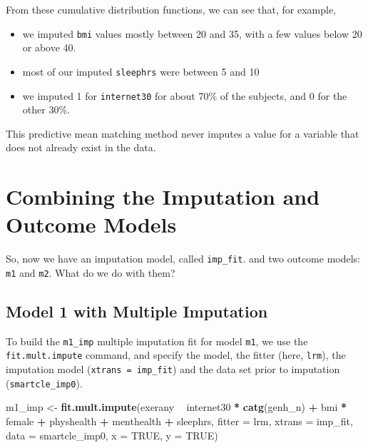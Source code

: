 \documentclass[]{book}
\newenvironment{Shaded}{\begin{snugshade}}{\end{snugshade}}
\newcommand{\KeywordTok}[1]{\textcolor[rgb]{0.13,0.29,0.53}{\textbf{#1}}}
\newcommand{\DataTypeTok}[1]{\textcolor[rgb]{0.13,0.29,0.53}{#1}}
\newcommand{\StringTok}[1]{\textcolor[rgb]{0.31,0.60,0.02}{#1}}
\newcommand{\OtherTok}[1]{\textcolor[rgb]{0.56,0.35,0.01}{#1}}
\newcommand{\OperatorTok}[1]{\textcolor[rgb]{0.81,0.36,0.00}{\textbf{#1}}}
\newcommand{\NormalTok}[1]{#1}
\providecommand{\tightlist}{%
  \setlength{\itemsep}{0pt}\setlength{\parskip}{0pt}}
\theoremstyle{definition}
\theoremstyle{definition}
\theoremstyle{definition}
\theoremstyle{remark}
\begin{document}
From these cumulative distribution functions, we can see that, for
example,

\begin{itemize}
\tightlist
\item
  we imputed \texttt{bmi} values mostly between 20 and 35, with a few
  values below 20 or above 40.
\item
  most of our imputed \texttt{sleephrs} were between 5 and 10
\item
  we imputed 1 for \texttt{internet30} for about 70\% of the subjects,
  and 0 for the other 30\%.
\end{itemize}

This predictive mean matching method never imputes a value for a
variable that does not already exist in the data.

\section{Combining the Imputation and Outcome
Models}\label{combining-the-imputation-and-outcome-models}

So, now we have an imputation model, called \texttt{imp\_fit}. and two
outcome models: \texttt{m1} and \texttt{m2}. What do we do with them?

\subsection{Model 1 with Multiple
Imputation}\label{model-1-with-multiple-imputation}

To build the \texttt{m1\_imp} multiple imputation fit for model
\texttt{m1}, we use the \texttt{fit.mult.impute} command, and specify
the model, the fitter (here, \texttt{lrm}), the imputation model
(\texttt{xtrans\ =\ imp\_fit}) and the data set prior to imputation
(\texttt{smartcle\_imp0}).

\begin{Shaded}
\begin{Highlighting}[]
\NormalTok{m1_imp <-}\StringTok{ }\KeywordTok{fit.mult.impute}\NormalTok{(exerany }\OperatorTok{~}\StringTok{ }
\StringTok{            }\NormalTok{internet30 }\OperatorTok{*}\StringTok{ }\KeywordTok{catg}\NormalTok{(genh_n) }\OperatorTok{+}\StringTok{ }\NormalTok{bmi }\OperatorTok{*}\StringTok{ }\NormalTok{female }\OperatorTok{+}
\StringTok{            }\NormalTok{physhealth }\OperatorTok{+}\StringTok{ }\NormalTok{menthealth }\OperatorTok{+}\StringTok{ }\NormalTok{sleephrs,}
            \DataTypeTok{fitter =}\NormalTok{ lrm, }\DataTypeTok{xtrans =}\NormalTok{ imp_fit,}
            \DataTypeTok{data =}\NormalTok{ smartcle_imp0, }\DataTypeTok{x =} \OtherTok{TRUE}\NormalTok{, }\DataTypeTok{y =} \OtherTok{TRUE}\NormalTok{)}
\end{Highlighting}
\end{Shaded}
\end{document}
